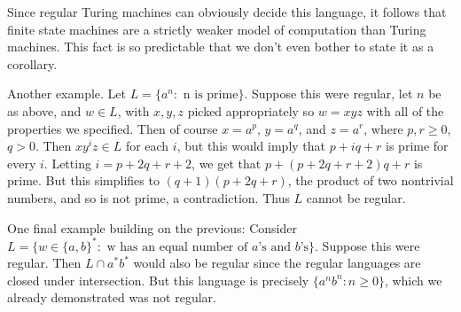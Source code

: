 \documentclass{article}
\theoremstyle{definition}
\theoremstyle{plain}
\theoremstyle{theorem}
\begin{document}
Since regular Turing machines can obviously decide this language, it follows that finite state machines are a strictly weaker model of computation than Turing machines. This fact is so predictable that we don't even bother to state it as a corollary. \par 
Another example. Let $L = \{a^n: \textrm{ n is prime}\}$. Suppose this were regular, let $n$ be as above, and $w \in L$, with $x,y,z$ picked appropriately so $w = xyz$ with all of the properties we specified. Then of course $x = a^p$, $y = a^q$, and $z=a^r$, where $p,r \geq 0$, $q > 0$. Then $xy^iz \in L$ for each $i$, but this would imply that $p+iq+r$ is prime for every $i$. Letting $i=p+2q+r+2$, we get that $p+(p+2q+r+2)q+r$ is prime. But this simplifies to $(q+1)(p+2q+r)$, the product of two nontrivial numbers, and so is not prime, a contradiction. Thus $L$ cannot be regular. \par 
One final example building on the previous: Consider $L = \{w \in \{a,b\}^*: \textrm{ w has an equal number of $a$'s and $b$'s}\}$. Suppose this were regular. Then $L \cap a^*b^*$ would also be regular since the regular languages are closed under intersection. But this language is precisely $\{a^nb^n: n \geq 0\}$, which we already demonstrated was not regular. 
\end{document}
